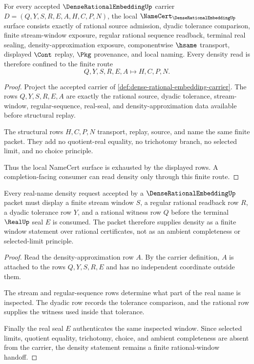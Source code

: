 \begin{theorem}
\label{thm:dense-rational-embedding-namecert-obligations}
For every accepted $\DenseRationalEmbeddingUp$ carrier $D=(Q,Y,S,R,E,A,H,C,P,N)$, the local $\NameCert_{\DenseRationalEmbeddingUp}$ surface consists exactly of rational source admission, dyadic tolerance comparison, finite stream-window exposure, regular rational sequence readback, terminal real sealing, density-approximation exposure, componentwise $\hsame$ transport, displayed $\Cont$ replay, $\Pkg$ provenance, and local naming. Every density read is therefore confined to the finite route
$$
Q,Y,S,R,E,A \longmapsto H,C,P,N .
$$
\end{theorem}
\begin{proof}
Project the accepted carrier of \autoref{def:dense-rational-embedding-carrier}. The rows $Q,Y,S,R,E,A$ are exactly the rational source, dyadic tolerance, stream-window, regular-sequence, real-seal, and density-approximation data available before structural replay.

The structural rows $H,C,P,N$ transport, replay, source, and name the same finite packet. They add no quotient-real equality, no trichotomy branch, no selected limit, and no choice principle.

Thus the local NameCert surface is exhausted by the displayed rows. A completion-facing consumer can read density only through this finite route.
\end{proof}

\begin{theorem}
\label{thm:dense-rational-embedding-density-window}
Every real-name density request accepted by a $\DenseRationalEmbeddingUp$ packet must display a finite stream window $S$, a regular rational readback row $R$, a dyadic tolerance row $Y$, and a rational witness row $Q$ before the terminal $\RealUp$ seal $E$ is consumed. The packet therefore supplies density as a finite window statement over rational certificates, not as an ambient completeness or selected-limit principle.
\end{theorem}
\begin{proof}
Read the density-approximation row $A$. By the carrier definition, $A$ is attached to the rows $Q,Y,S,R,E$ and has no independent coordinate outside them.

The stream and regular-sequence rows determine what part of the real name is inspected. The dyadic row records the tolerance comparison, and the rational row supplies the witness used inside that tolerance.

Finally the real seal $E$ authenticates the same inspected window. Since selected limits, quotient equality, trichotomy, choice, and ambient completeness are absent from the carrier, the density statement remains a finite rational-window handoff.
\end{proof}

